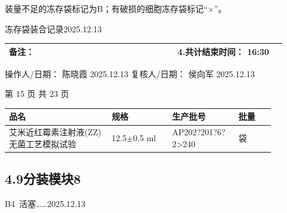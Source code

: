 \documentclass[UTF8,10pt,a4paper,fontset=fandol]{ctexart}
\newcommand{\fieldvalue}[1]{#1}
\newcommand{\handwritten}[1]{#1}
\begin{document}
\noindent
装量不足的冻存袋标记为B；有破损的细胞冻存袋标记“$\times$”。

\noindent
\handwritten{冻存袋装合记录2025.12.13}

\begin{center}
\small
\begin{tabular}{|p{0.56\linewidth}|p{0.36\linewidth}|}
\hline
备注：&
4.共计结束时间：
\fieldvalue{\handwritten{16:30}}\\
\hline
\end{tabular}
\end{center}

\noindent
操作人/日期：
\fieldvalue{\handwritten{陈晓霞}}
\quad
\fieldvalue{\handwritten{2025.12.13}}
\hfill
复核人/日期：
\fieldvalue{\handwritten{侯向军}}
\quad
\fieldvalue{\handwritten{2025.12.13}}

\begin{center}
第 15 页 共 23 页
\end{center}

\newpage

\begin{center}
\small
\begin{tabular}{|p{0.34\linewidth}|p{0.20\linewidth}|p{0.22\linewidth}|p{0.12\linewidth}|}
\hline
品名 & 规格 & 生产批号 & 批量 \\ \hline
艾米近红霉素注射液(ZZ)无菌工艺模拟试验
&
12.5$\pm$0.5 ml
&
\fieldvalue{\handwritten{AP202?201?6?2>240}}
&
袋
\\ \hline
\end{tabular}
\end{center}

\subsection*{4.9\quad 分装模块8}
\handwritten{B4\ 活塞……2025.12.13}
\end{document}
